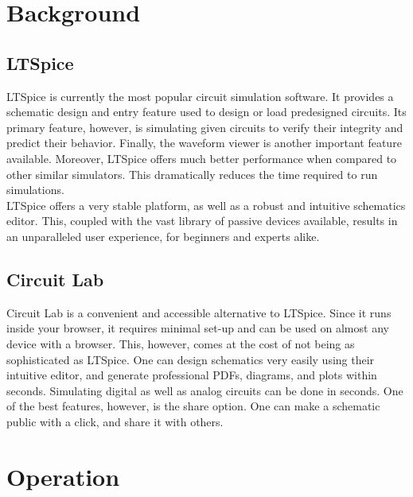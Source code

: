 \documentclass{article}
\begin{document}

\section{Background}

\subsection{LTSpice}
LTSpice is currently the most popular circuit simulation software. It provides a schematic design and entry feature used to design or load predesigned circuits. Its primary feature, however, is simulating given circuits to verify their integrity and predict their behavior. Finally, the waveform viewer is another important feature available. Moreover, LTSpice offers much better performance when compared to other similar simulators. This dramatically reduces the time required to run simulations. \\
LTSpice offers a very stable platform, as well as a robust and intuitive schematics editor. This, coupled with the vast library of passive devices available, results in an unparalleled user experience, for beginners and experts alike.
\subsection{Circuit Lab}
Circuit Lab is a convenient and accessible alternative to LTSpice. Since it runs inside your browser, it requires minimal set-up and can be used on almost any device with a browser. This, however, comes at the cost of not being as sophisticated as LTSpice. One  can design schematics very easily using their intuitive editor, and generate professional PDFs, diagrams, and plots within seconds. Simulating digital as well as analog circuits can be done in seconds. One of the best features, however, is the share option. One can make a schematic public with a click, and share it with others.


\section{Operation}
\end{document}
